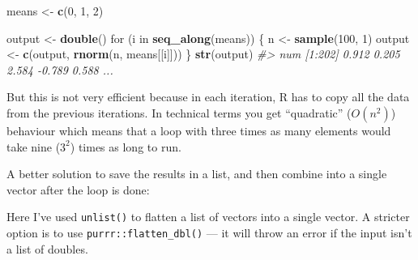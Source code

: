 \documentclass[]{book}
\newenvironment{Shaded}{\begin{snugshade}}{\end{snugshade}}
\newcommand{\KeywordTok}[1]{\textcolor[rgb]{0.13,0.29,0.53}{\textbf{{#1}}}}
\newcommand{\DecValTok}[1]{\textcolor[rgb]{0.00,0.00,0.81}{{#1}}}
\newcommand{\StringTok}[1]{\textcolor[rgb]{0.31,0.60,0.02}{{#1}}}
\newcommand{\CommentTok}[1]{\textcolor[rgb]{0.56,0.35,0.01}{\textit{{#1}}}}
\newcommand{\NormalTok}[1]{{#1}}
\begin{document}
\begin{Shaded}
\begin{Highlighting}[]
\NormalTok{means <-}\StringTok{ }\KeywordTok{c}\NormalTok{(}\DecValTok{0}\NormalTok{, }\DecValTok{1}\NormalTok{, }\DecValTok{2}\NormalTok{)}

\NormalTok{output <-}\StringTok{ }\KeywordTok{double}\NormalTok{()}
\NormalTok{for (i in }\KeywordTok{seq_along}\NormalTok{(means)) \{}
  \NormalTok{n <-}\StringTok{ }\KeywordTok{sample}\NormalTok{(}\DecValTok{100}\NormalTok{, }\DecValTok{1}\NormalTok{)}
  \NormalTok{output <-}\StringTok{ }\KeywordTok{c}\NormalTok{(output, }\KeywordTok{rnorm}\NormalTok{(n, means[[i]]))}
\NormalTok{\}}
\KeywordTok{str}\NormalTok{(output)}
\CommentTok{#>  num [1:202] 0.912 0.205 2.584 -0.789 0.588 ...}
\end{Highlighting}
\end{Shaded}

But this is not very efficient because in each iteration, R has to copy
all the data from the previous iterations. In technical terms you get
``quadratic'' (\(O(n^2)\)) behaviour which means that a loop with three
times as many elements would take nine (\(3^2\)) times as long to run.

A better solution to save the results in a list, and then combine into a
single vector after the loop is done:

\begin{Shaded}
\end{Shaded}

Here I've used \texttt{unlist()} to flatten a list of vectors into a
single vector. A stricter option is to use
\texttt{purrr::flatten\_dbl()} --- it will throw an error if the input
isn't a list of doubles.
\end{document}
